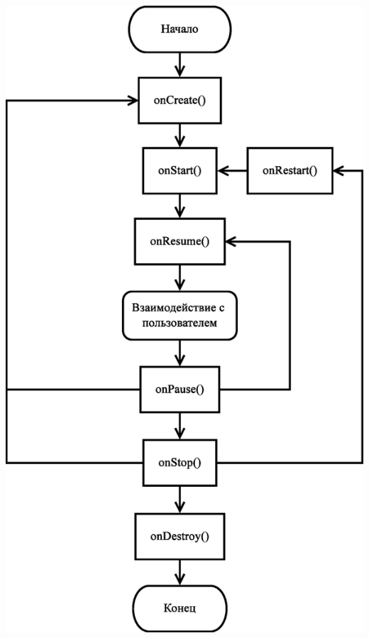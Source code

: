 \documentclass[russian,utf8,a1paper,nostitching,simple]{eskdgraph}
\begin{document}
\begin{ESKDdrawing}
\begin{minipage}{45cm}
  \end{minipage}
  \hspace{2cm}
  \begin{minipage}{32cm}
    \centering
     \\
    \vspace{2cm}
    \centering
    \includegraphics[height=48cm]{fig/implementation_ui_lifecycle_activity.eps}
  \end{minipage}
\end{ESKDdrawing}

\setcounter{page}{1}
\begin{ESKDdrawing}
\end{ESKDdrawing}
\end{document}
